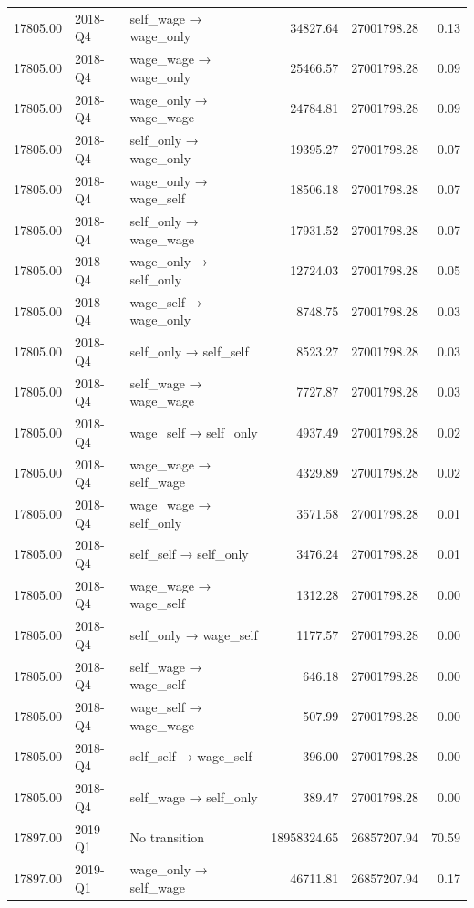 \begin{table}[ht]
{\begin{tabular}{rllrrr}
  17805.00 & 2018-Q4 & self\_wage → wage\_only & 34827.64 & 27001798.28 & 0.13 \\ 
  17805.00 & 2018-Q4 & wage\_wage → wage\_only & 25466.57 & 27001798.28 & 0.09 \\ 
  17805.00 & 2018-Q4 & wage\_only → wage\_wage & 24784.81 & 27001798.28 & 0.09 \\ 
  17805.00 & 2018-Q4 & self\_only → wage\_only & 19395.27 & 27001798.28 & 0.07 \\ 
  17805.00 & 2018-Q4 & wage\_only → wage\_self & 18506.18 & 27001798.28 & 0.07 \\ 
  17805.00 & 2018-Q4 & self\_only → wage\_wage & 17931.52 & 27001798.28 & 0.07 \\ 
  17805.00 & 2018-Q4 & wage\_only → self\_only & 12724.03 & 27001798.28 & 0.05 \\ 
  17805.00 & 2018-Q4 & wage\_self → wage\_only & 8748.75 & 27001798.28 & 0.03 \\ 
  17805.00 & 2018-Q4 & self\_only → self\_self & 8523.27 & 27001798.28 & 0.03 \\ 
  17805.00 & 2018-Q4 & self\_wage → wage\_wage & 7727.87 & 27001798.28 & 0.03 \\ 
  17805.00 & 2018-Q4 & wage\_self → self\_only & 4937.49 & 27001798.28 & 0.02 \\ 
  17805.00 & 2018-Q4 & wage\_wage → self\_wage & 4329.89 & 27001798.28 & 0.02 \\ 
  17805.00 & 2018-Q4 & wage\_wage → self\_only & 3571.58 & 27001798.28 & 0.01 \\ 
  17805.00 & 2018-Q4 & self\_self → self\_only & 3476.24 & 27001798.28 & 0.01 \\ 
  17805.00 & 2018-Q4 & wage\_wage → wage\_self & 1312.28 & 27001798.28 & 0.00 \\ 
  17805.00 & 2018-Q4 & self\_only → wage\_self & 1177.57 & 27001798.28 & 0.00 \\ 
  17805.00 & 2018-Q4 & self\_wage → wage\_self & 646.18 & 27001798.28 & 0.00 \\ 
  17805.00 & 2018-Q4 & wage\_self → wage\_wage & 507.99 & 27001798.28 & 0.00 \\ 
  17805.00 & 2018-Q4 & self\_self → wage\_self & 396.00 & 27001798.28 & 0.00 \\ 
  17805.00 & 2018-Q4 & self\_wage → self\_only & 389.47 & 27001798.28 & 0.00 \\ 
  17897.00 & 2019-Q1 & No transition & 18958324.65 & 26857207.94 & 70.59 \\ 
  17897.00 & 2019-Q1 & wage\_only → self\_wage & 46711.81 & 26857207.94 & 0.17 \\ 

\end{tabular}}
\end{table}
